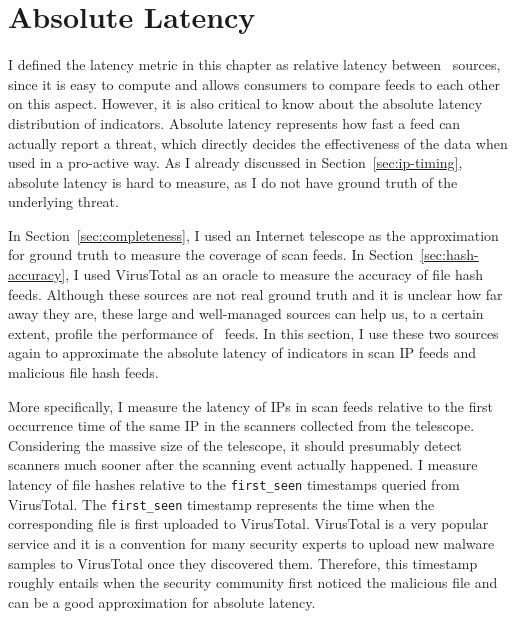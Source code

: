 \section{Absolute Latency}
\label{sec:abs_latency}

I defined the latency metric in this chapter as relative latency between \ti\
sources, since it is easy to compute and allows consumers to compare feeds
to each other on this aspect. However, it is also critical to know
about the absolute latency distribution of indicators. Absolute latency
represents how fast a feed can actually report a threat, which directly decides
the effectiveness of the data when used in a pro-active way. As I already
discussed in Section~\ref{sec:ip-timing}, absolute latency is hard to measure,
as I do not have ground truth of the underlying threat.

In Section~\ref{sec:completeness}, I used an Internet telescope as the approximation
for ground truth to measure the coverage of scan feeds. In Section~\ref{sec:hash-accuracy},
I used VirusTotal as an oracle to measure the accuracy of file hash feeds.
Although these sources are not real ground truth and it is unclear how far away
they are, these large and well-managed sources can help us, to a certain extent,
profile the performance of \ti\ feeds. In this section, I use these two sources
again to approximate the absolute latency of indicators in scan IP feeds and
malicious file hash feeds.

More specifically, I measure the latency of IPs in scan feeds
relative to the first occurrence time of the same IP in the scanners collected from
the telescope. Considering the massive size of the telescope, it should presumably
detect scanners much sooner after the scanning event actually happened.
I measure latency of file hashes relative to the \texttt{first\_seen} timestamps queried
from VirusTotal. The \texttt{first\_seen} timestamp represents the time when the corresponding
file is first uploaded to VirusTotal. VirusTotal is a very popular service and it is a
convention for many security experts to upload new malware samples to VirusTotal once
they discovered them. Therefore, this timestamp roughly entails when the security
community first noticed the malicious file and can be a good approximation for absolute
latency.

